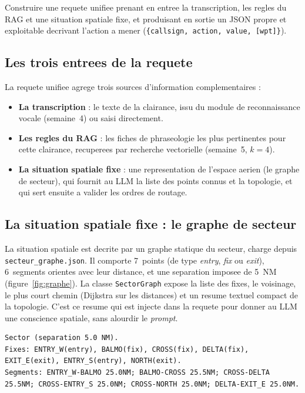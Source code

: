 \documentclass[11pt,a4paper]{article}
\begin{document}
\begin{objbox}
Construire une requete unifiee prenant en entree la transcription, les regles du RAG
et une situation spatiale fixe, et produisant en sortie un JSON propre et exploitable
decrivant l'action a mener (\texttt{\{callsign, action, value, [wpt]\}}).
\end{objbox}

\subsection{Les trois entrees de la requete}

La requete unifiee agrege trois sources d'information complementaires :

\begin{itemize}
  \item \textbf{La transcription} : le texte de la clairance, issu du module de
  reconnaissance vocale (semaine~4) ou saisi directement.
  \item \textbf{Les regles du RAG} : les fiches de phraseologie les plus pertinentes
  pour cette clairance, recuperees par recherche vectorielle (semaine~5, $k = 4$).
  \item \textbf{La situation spatiale fixe} : une representation de l'espace aerien
  (le graphe de secteur), qui fournit au LLM la liste des points connus et la
  topologie, et qui sert ensuite a valider les ordres de routage.
\end{itemize}

\subsection{La situation spatiale fixe : le graphe de secteur}

La situation spatiale est decrite par un graphe statique du secteur, charge depuis
\texttt{secteur\_graphe.json}. Il comporte 7~points (de type \emph{entry}, \emph{fix}
ou \emph{exit}), 6~segments orientes avec leur distance, et une separation imposee de
5~NM (figure~\ref{fig:graphe}). La classe \texttt{SectorGraph} expose la liste des
fixes, le voisinage, le plus court chemin (Dijkstra sur les distances) et un resume
textuel compact de la topologie. C'est ce resume qui est injecte dans la requete pour
donner au LLM une conscience spatiale, sans alourdir le \emph{prompt}.

\begin{lstlisting}[caption={Resume textuel de la topologie injecte dans la requete (\texttt{topology\_text()}).}]
Sector (separation 5.0 NM).
Fixes: ENTRY_W(entry), BALMO(fix), CROSS(fix), DELTA(fix), EXIT_E(exit), ENTRY_S(entry), NORTH(exit).
Segments: ENTRY_W-BALMO 25.0NM; BALMO-CROSS 25.5NM; CROSS-DELTA 25.5NM; CROSS-ENTRY_S 25.0NM; CROSS-NORTH 25.0NM; DELTA-EXIT_E 25.0NM.
\end{lstlisting}
\end{document}
